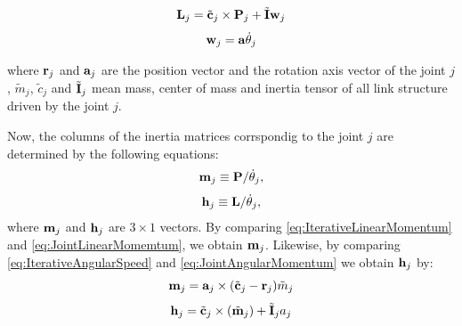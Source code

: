 \begin{equation}
\begin{aligned}
{\bf L}_j &= \tilde{\bf c}_j \times {\bf P}_j + \tilde{\bf I}{\bf w}_j \\
\end{aligned}
\label{eq:IterativeAngularMomentum}
\end{equation}
\begin{equation}
\begin{aligned}
{\bf w}_j &= {\bf a}\dot{\theta}_j \\
\end{aligned}
\label{eq:IterativeAngularSpeed}
\end{equation}

where ${\bf r}_j$ and ${\bf a}_j$ are the position vector and the rotation axis vector
of the joint $j$, $\tilde{m}_j$, $\tilde{c}_j$ and $\tilde{\bf I}_j$ mean mass,
center of mass and inertia tensor of all link structure driven by the joint $j$.
\par
Now, the columns of the inertia matrices corrspondig to the joint $j$ are determined
by the following equations:
\begin{equation}
\begin{aligned}
{\bf m}_j & \equiv {\bf P}/\dot{\theta}_j, \\
\end{aligned}
\label{eq:JointLinearMomemtum}
\end{equation}
\begin{equation}
\begin{aligned}
{\bf h}_j & \equiv {\bf L}/\dot{\theta}_j, \\
\end{aligned}
\label{eq:JointAngularMomentum}
\end{equation}
where ${\bf m}_j$  and ${\bf h}_j$ are $3 \times 1$ vectors. By comparing 
\ref{eq:IterativeLinearMomentum} and \ref{eq:JointLinearMomemtum}, we obtain
${\bf m}_j$. Likewise, by comparing \ref{eq:IterativeAngularSpeed}
and \ref{eq:JointAngularMomentum} we obtain ${\bf h}_j$ by:
\begin{equation}
{\bf m}_j = {\bf a}_j \times ( \tilde{\bf c}_j - {\bf r}_j) \tilde{m}_j
\label{eq:IterativeLinearMomentum2}
\end{equation}
\begin{equation}
{\bf h}_j = \tilde{\bf c}_j \times ( \tilde{\bf m}_j ) + \tilde{\bf I}_j a_j
\label{eq:IterativeLinearMomentum2}
\end{equation}

